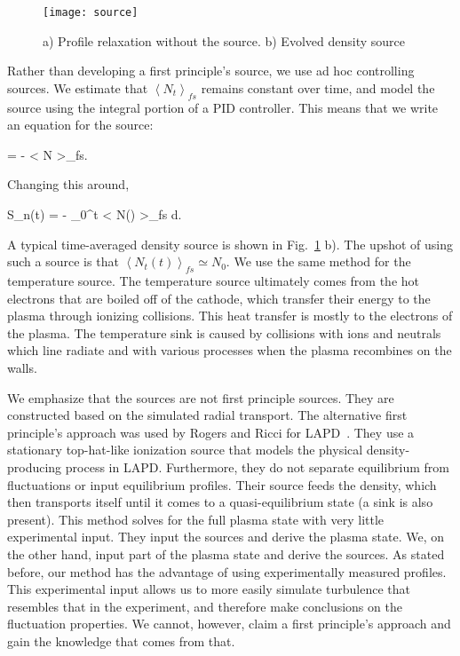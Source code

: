 \begin{figure}[!htbp]
\texttt{[image: source]}
\hfil
\caption{a) Profile relaxation without the source. b) Evolved density source}
\label{source}
\end{figure}


Rather than developing a first principle's source, we use ad hoc controlling sources. We estimate that $\left< N_t \right>_{fs}$ remains constant over time, and model the source using the integral
portion of a PID controller. This means that we write an equation for the source:

\beq
\label{Sn_eq}
 = - \left< N \right>_{fs}.
\eeq

Changing this around,

\beq
\label{Sn_eq2}
S_n(t) = - \int_0^t \left< N(\tau) \right>_{fs} d\tau.
\eeq

A typical time-averaged density source is shown in Fig.~\ref{source} b).
The upshot of using such a source is that $\left< N_t(t) \right>_{fs} \simeq N_0$. 
We use the same method for the temperature source. The temperature source ultimately comes from the hot electrons that are boiled off of
the cathode, which transfer their energy to the plasma through ionizing collisions. This heat transfer is mostly to the electrons of the plasma. The temperature sink is caused by collisions
with ions and neutrals which line radiate and with various processes when the plasma recombines on the walls.

We emphasize that the sources are not first principle sources. They are constructed based on the simulated radial transport. The alternative first principle's approach was used by Rogers and Ricci
for LAPD~\cite{rogers2010}. They use a stationary top-hat-like ionization source that models the physical density-producing process in LAPD. 
Furthermore, they do not separate equilibrium from fluctuations or input equilibrium profiles. Their source feeds the density, which then transports itself until it comes to a quasi-equilibrium state
(a sink is also present). This method solves for the full plasma state with very little experimental input. 
They input the sources and derive the plasma state. We, on the other hand, input part of the plasma
state and derive the sources. As stated before, our method has the advantage of using experimentally measured profiles. 
This experimental input allows us to more easily simulate turbulence that resembles that
in the experiment, and therefore make conclusions on the fluctuation properties. We cannot, however, claim a first principle's approach and gain the knowledge that comes from that.

